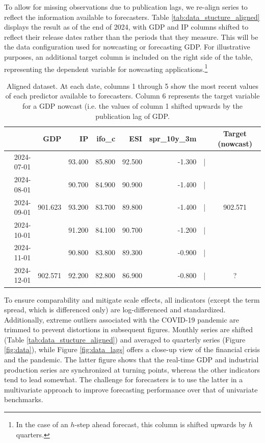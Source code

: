 \documentclass[11pt,a4paper]{article}
\begin{document}
To allow for missing observations due to publication lags, we re-align series to reflect the information available to forecasters. Table \eqref{tab:data_stucture_aligned} displays the result as of the end of 2024, with GDP and IP columns shifted to reflect their release dates rather than the periods that they measure. This will be the data configuration used for nowcasting or forecasting GDP. For illustrative purposes, an additional target column is included on the right side of the table, representing the dependent variable for nowcasting applications.\footnote{In the case of an $h$-step ahead forecast, this column is shifted upwards by $h$ quarters.} 


\begin{table}[ht]
\centering
\begin{tabular}{rrrrrrrc}
  \hline
 & GDP & IP & ifo\_c & ESI & spr\_10y\_3m &&Target (nowcast)\\ 
  \hline
  2024-07-01 & & 93.400 & 85.800 & 92.500 & -1.300&|& \\ 
  2024-08-01 & & 90.700&  84.900 & 90.900 & -1.400&| &\\ 
  2024-09-01 & 901.623 &93.200 & 83.700 & 89.800 & -1.400&| &902.571\\ 
  2024-10-01 &  &91.200 & 84.100 & 90.700 & -1.200&| &\\ 
  2024-11-01 &  & 90.800& 83.800 & 89.300 & -0.900&| &\\ 
  2024-12-01 &902.571   & 92.200  & 82.800 & 86.900 & -0.800&| &?\\ 
    \hline
\end{tabular}
\caption{Aligned dataset. At each date, columns 1 through 5 show the most recent values of each predictor available to forecasters. Column 6 represents the target variable for a GDP nowcast (i.e. the values of column 1 shifted upwards by the publication lag of GDP.} 
\label{tab:data_stucture_aligned}
\end{table}



To ensure comparability and mitigate scale effects, all indicators (except the term spread, which is differenced only) are log-differenced and standardized. Additionally, extreme outliers associated with the COVID-19 pandemic are trimmed to prevent distortions in subsequent figures. 
 Monthly series are shifted (Table \eqref{tab:data_stucture_aligned}) and averaged to quarterly series (Figure \eqref{fig:data}), while Figure \eqref{fig:data_lags} offers a close-up view of the financial crisis and the pandemic. The latter figure shows that the real-time GDP and industrial production series are synchronized at turning points, whereas the other indicators tend to lead somewhat. The challenge for forecasters is to use the latter in a multivariate approach to improve forecasting performance over that of univariate benchmarks. 
\end{document}
